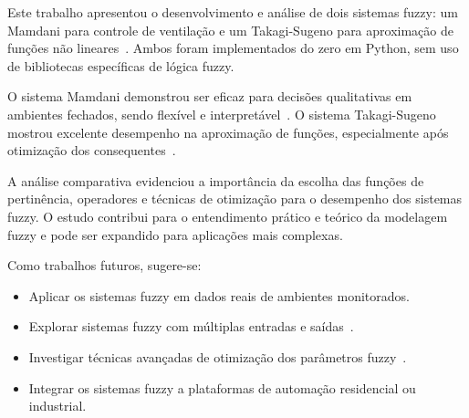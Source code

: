 Este trabalho apresentou o desenvolvimento e análise de dois sistemas fuzzy: um Mamdani para controle de ventilação e um Takagi-Sugeno para aproximação de funções não lineares~\cite{mamdani1975experiment,takagi1985fuzzy}. Ambos foram implementados do zero em Python, sem uso de bibliotecas específicas de lógica fuzzy.

O sistema Mamdani demonstrou ser eficaz para decisões qualitativas em ambientes fechados, sendo flexível e interpretável~\cite{ross2010fuzzy}. O sistema Takagi-Sugeno mostrou excelente desempenho na aproximação de funções, especialmente após otimização dos consequentes~\cite{haykin2008neural}.

A análise comparativa evidenciou a importância da escolha das funções de pertinência, operadores e técnicas de otimização para o desempenho dos sistemas fuzzy. O estudo contribui para o entendimento prático e teórico da modelagem fuzzy e pode ser expandido para aplicações mais complexas.

Como trabalhos futuros, sugere-se:
\begin{itemize}
    \item Aplicar os sistemas fuzzy em dados reais de ambientes monitorados.
    \item Explorar sistemas fuzzy com múltiplas entradas e saídas~\cite{ross2010fuzzy}.
    \item Investigar técnicas avançadas de otimização dos parâmetros fuzzy~\cite{haykin2008neural}.
    \item Integrar os sistemas fuzzy a plataformas de automação residencial ou industrial.
\end{itemize}

